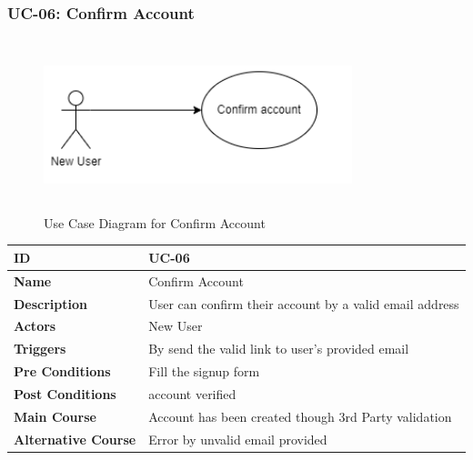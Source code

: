     \subsubsection{UC-06: Confirm Account}
    \begin{figure}[H]
        \includegraphics[height=5cm, width=0.8\textwidth]{./diagrams/Use Case/u6.png}
        \centering 
        \caption{Use Case Diagram for Confirm Account}
        \label{fig:Usecase1}
        \end{figure}
        
    \begin{center}
        \begin{tabularx}{\textwidth}{|l|X|}
            \hline
            \textbf{ID} & UC-06 \\
            \hline
            \textbf{Name} & Confirm Account \\
            \hline
            \textbf{Description} & User can confirm their account by a valid email address \\
            \hline
            \textbf{Actors} & New User \\
            \hline
            \textbf{Triggers} & By send the valid link to user's provided email \\
            \hline
            \textbf{Pre Conditions} & Fill the signup form \\
            \hline
            \textbf{Post Conditions} & account verified \\
            \hline
            \textbf{Main Course} & Account has been created though 3rd Party validation \\
            \hline
            \textbf{Alternative Course} & Error by unvalid email provided \\
            \hline
            
        \end{tabularx}
    \end{center}
    \newpage
    

